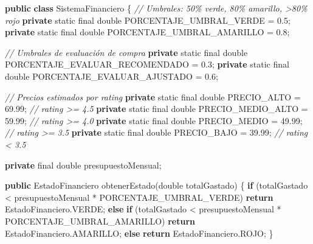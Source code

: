 \documentclass[
  spanish,
  11pt,
  paper=a4,
  ,captions=tableheading
]{scrartcl}
\newenvironment{Shaded}{}{}
\newcommand{\CommentTok}[1]{\textcolor[rgb]{0.38,0.63,0.69}{\textit{#1}}}
\newcommand{\ControlFlowTok}[1]{\textcolor[rgb]{0.00,0.44,0.13}{\textbf{#1}}}
\newcommand{\DataTypeTok}[1]{\textcolor[rgb]{0.56,0.13,0.00}{#1}}
\newcommand{\FloatTok}[1]{\textcolor[rgb]{0.25,0.63,0.44}{#1}}
\newcommand{\FunctionTok}[1]{\textcolor[rgb]{0.02,0.16,0.49}{#1}}
\newcommand{\KeywordTok}[1]{\textcolor[rgb]{0.00,0.44,0.13}{\textbf{#1}}}
\newcommand{\NormalTok}[1]{#1}
\newcommand{\OperatorTok}[1]{\textcolor[rgb]{0.40,0.40,0.40}{#1}}
\begin{document}
\begin{Shaded}
\begin{Highlighting}[]
\KeywordTok{public} \KeywordTok{class}\NormalTok{ SistemaFinanciero }\OperatorTok{\{}
    \CommentTok{// Umbrales: 50\% verde, 80\% amarillo, \textgreater{}80\% rojo}
    \KeywordTok{private} \DataTypeTok{static} \DataTypeTok{final} \DataTypeTok{double}\NormalTok{ PORCENTAJE\_UMBRAL\_VERDE }\OperatorTok{=} \FloatTok{0.5}\OperatorTok{;}
    \KeywordTok{private} \DataTypeTok{static} \DataTypeTok{final} \DataTypeTok{double}\NormalTok{ PORCENTAJE\_UMBRAL\_AMARILLO }\OperatorTok{=} \FloatTok{0.8}\OperatorTok{;}

    \CommentTok{// Umbrales de evaluación de compra}
    \KeywordTok{private} \DataTypeTok{static} \DataTypeTok{final} \DataTypeTok{double}\NormalTok{ PORCENTAJE\_EVALUAR\_RECOMENDADO }\OperatorTok{=} \FloatTok{0.3}\OperatorTok{;}
    \KeywordTok{private} \DataTypeTok{static} \DataTypeTok{final} \DataTypeTok{double}\NormalTok{ PORCENTAJE\_EVALUAR\_AJUSTADO }\OperatorTok{=} \FloatTok{0.6}\OperatorTok{;}

    \CommentTok{// Precios estimados por rating}
    \KeywordTok{private} \DataTypeTok{static} \DataTypeTok{final} \DataTypeTok{double}\NormalTok{ PRECIO\_ALTO }\OperatorTok{=} \FloatTok{69.99}\OperatorTok{;}    \CommentTok{// rating \textgreater{}= 4.5}
    \KeywordTok{private} \DataTypeTok{static} \DataTypeTok{final} \DataTypeTok{double}\NormalTok{ PRECIO\_MEDIO\_ALTO }\OperatorTok{=} \FloatTok{59.99}\OperatorTok{;} \CommentTok{// rating \textgreater{}= 4.0}
    \KeywordTok{private} \DataTypeTok{static} \DataTypeTok{final} \DataTypeTok{double}\NormalTok{ PRECIO\_MEDIO }\OperatorTok{=} \FloatTok{49.99}\OperatorTok{;}   \CommentTok{// rating \textgreater{}= 3.5}
    \KeywordTok{private} \DataTypeTok{static} \DataTypeTok{final} \DataTypeTok{double}\NormalTok{ PRECIO\_BAJO }\OperatorTok{=} \FloatTok{39.99}\OperatorTok{;}    \CommentTok{// rating \textless{} 3.5}

    \KeywordTok{private} \DataTypeTok{final} \DataTypeTok{double}\NormalTok{ presupuestoMensual}\OperatorTok{;}

    \KeywordTok{public}\NormalTok{ EstadoFinanciero }\FunctionTok{obtenerEstado}\OperatorTok{(}\DataTypeTok{double}\NormalTok{ totalGastado}\OperatorTok{)} \OperatorTok{\{}
        \ControlFlowTok{if} \OperatorTok{(}\NormalTok{totalGastado }\OperatorTok{\textless{}}\NormalTok{ presupuestoMensual }\OperatorTok{*}\NormalTok{ PORCENTAJE\_UMBRAL\_VERDE}\OperatorTok{)}
            \ControlFlowTok{return}\NormalTok{ EstadoFinanciero}\OperatorTok{.}\FunctionTok{VERDE}\OperatorTok{;}
        \ControlFlowTok{else} \ControlFlowTok{if} \OperatorTok{(}\NormalTok{totalGastado }\OperatorTok{\textless{}}\NormalTok{ presupuestoMensual }\OperatorTok{*}\NormalTok{ PORCENTAJE\_UMBRAL\_AMARILLO}\OperatorTok{)}
            \ControlFlowTok{return}\NormalTok{ EstadoFinanciero}\OperatorTok{.}\FunctionTok{AMARILLO}\OperatorTok{;}
        \ControlFlowTok{else}
            \ControlFlowTok{return}\NormalTok{ EstadoFinanciero}\OperatorTok{.}\FunctionTok{ROJO}\OperatorTok{;}
    \OperatorTok{\}}


\end{Highlighting}
\end{Shaded}
\end{document}
